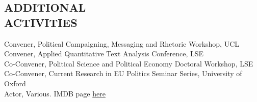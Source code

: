 \documentclass[centered]{res}
\begin{document}
\begin{resume}
\section{ADDITIONAL \\ ACTIVITIES}             
            Convener, Political Campaigning, Messaging and Rhetoric Workshop, UCL \\
            Convener, Applied Quantitative Text Analysis Conference, LSE \\
            Co-Convener, Political Science and Political Economy Doctoral Workshop, LSE \\
            Co-Convener, Current Research in EU Politics Seminar Series, University of Oxford \\
            Actor, Various. IMDB page \href{http://www.imdb.com/name/nm0089773/?ref_=nmbio_bio_nm}{here}
 

\end{resume}
\end{document}
